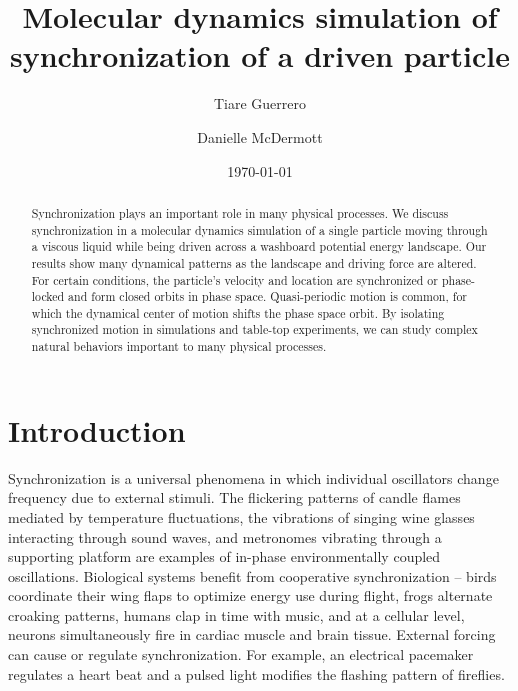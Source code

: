 \documentclass[preprint,showpacs,preprintnumbers,amsmath,amssymb,aps,prb]{revtex4-1}
\theoremstyle{remark}
\begin{document}
\title{Molecular dynamics simulation of synchronization of a  driven particle}
 
\author{Tiare Guerrero}

\author{Danielle McDermott}

\date{\today}

\begin{abstract}
  Synchronization
  plays an important role in many physical processes.
  We discuss synchronization in a 
  molecular dynamics simulation
  of a single particle
  moving through
  a viscous liquid
  while being driven 
  across a washboard potential energy landscape.
  Our results show many dynamical patterns
  as the landscape and driving force are altered.
  For certain conditions,
  the particle's velocity and location
  are synchronized or 
  phase-locked and
  form closed orbits in phase space.
  Quasi-periodic motion is common, 
  for which the
  dynamical center of motion shifts the
  phase space orbit.
  By 
  isolating
  synchronized motion
  in 
  simulations and table-top experiments,
  we 
  can study %
  complex natural behaviors
  important to many physical processes.
\end{abstract}

\maketitle 

\section{Introduction} 
Synchronization is a universal phenomena
in which
individual oscillators change frequency due
to external stimuli.\cite{Pikovsky2003}
The
flickering patterns of
candle flames 
mediated by temperature fluctuations,\cite{Okamoto2016}
the vibrations of singing wine glasses interacting 
through sound waves,\cite{Arane2009}
and metronomes vibrating through a supporting platform\cite{Jia2015}
are examples of in-phase environmentally coupled oscillations. 
Biological systems benefit from cooperative
synchronization --
birds  coordinate their wing flaps
to optimize energy use during flight,\cite{Portugal2014}
frogs alternate croaking patterns,\cite{Aihara2014}
humans clap in time with music,\cite{Tranchant2016}
and 
at a cellular level, 
neurons simultaneously fire in cardiac muscle\cite{MartinHall1999}
and brain tissue.\cite{Singer1999}
External forcing
can cause or regulate synchronization.
For example, 
an electrical pacemaker 
regulates a heart beat and
a pulsed light modifies the
flashing pattern of fireflies.
\end{document}
